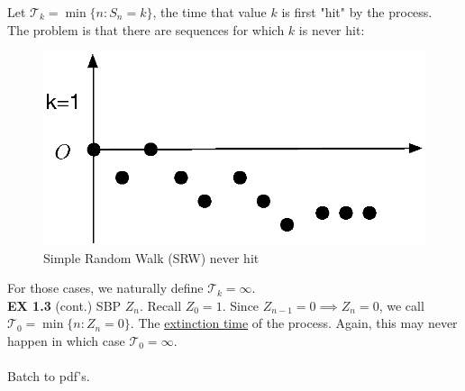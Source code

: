 \documentclass[12pt]{article}
\theoremstyle{definition}
\theoremstyle{plain}
\begin{document}
Let $\mathcal{T}_k = \min \{n:S_n = k\}$, the time that value $k$ is first "hit" by the process.\\
The problem is that there are sequences for which $k$ is never hit: 
\begin{figure}[h]
\centering
\includegraphics[scale=.5]{SRW2.eps}
\caption{Simple Random Walk (SRW) never hit}
\label{1:SRW2}
\end{figure}
For those cases, we naturally define $\mathcal{T}_k = \infty$. \\
\textbf{EX 1.3} (cont.) SBP $Z_n$. Recall $Z_0 = 1$. Since $Z_{n-1}=0\implies Z_n=0$, we call $\mathcal{T}_0 = \min\{n: Z_n =0\}$. The \underline{extinction time} of the process. Again, this may never happen in which case $\mathcal{T}_0 = \infty$. \\ \\
Batch to pdf's.
\end{document}
